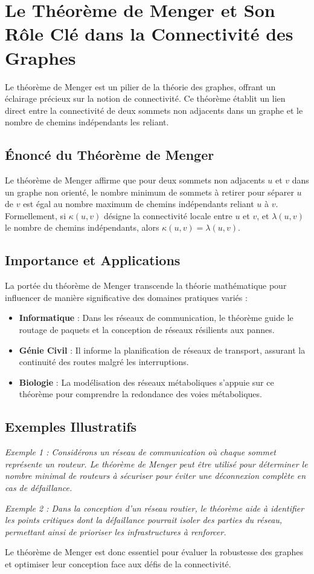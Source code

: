 \newpage
\section{Le Théorème de Menger et Son Rôle Clé dans la Connectivité des Graphes}

Le théorème de Menger est un pilier de la théorie des graphes, offrant un éclairage précieux sur la notion de connectivité. Ce théorème établit un lien direct entre la connectivité de deux sommets non adjacents dans un graphe et le nombre de chemins indépendants les reliant.

\subsection{Énoncé du Théorème de Menger}
Le théorème de Menger affirme que pour deux sommets non adjacents \( u \) et \( v \) dans un graphe non orienté, le nombre minimum de sommets à retirer pour séparer \( u \) de \( v \) est égal au nombre maximum de chemins indépendants reliant \( u \) à \( v \). Formellement, si \( \kappa(u, v) \) désigne la connectivité locale entre \( u \) et \( v \), et \( \lambda(u, v) \) le nombre de chemins indépendants, alors \( \kappa(u, v) = \lambda(u, v) \).

\subsection{Importance et Applications}
La portée du théorème de Menger transcende la théorie mathématique pour influencer de manière significative des domaines pratiques variés :
\begin{itemize}
    \item \textbf{Informatique} : Dans les réseaux de communication, le théorème guide le routage de paquets et la conception de réseaux résilients aux pannes.
    \item \textbf{Génie Civil} : Il informe la planification de réseaux de transport, assurant la continuité des routes malgré les interruptions.
    \item \textbf{Biologie} : La modélisation des réseaux métaboliques s'appuie sur ce théorème pour comprendre la redondance des voies métaboliques.
\end{itemize}

\subsection{Exemples Illustratifs}
\textit{Exemple 1 : Considérons un réseau de communication où chaque sommet représente un routeur. Le théorème de Menger peut être utilisé pour déterminer le nombre minimal de routeurs à sécuriser pour éviter une déconnexion complète en cas de défaillance.}

\textit{Exemple 2 : Dans la conception d'un réseau routier, le théorème aide à identifier les points critiques dont la défaillance pourrait isoler des parties du réseau, permettant ainsi de prioriser les infrastructures à renforcer.}

Le théorème de Menger est donc essentiel pour évaluer la robustesse des graphes et optimiser leur conception face aux défis de la connectivité.

